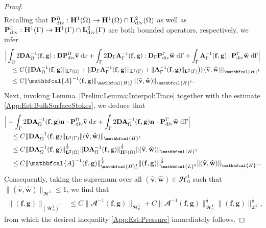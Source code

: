 \documentclass[10pt,reqno]{amsart}
\theoremstyle{remark}
\numberwithin{equation}{section}
\newcommand{\Bigabs}[1]{\Big| #1 \Big|}
\newcommand{\norm}[1]{\| #1 \|}
\newcommand{\n}{\mathbf{n}}
\newcommand{\bv}{\mathbf{v}}
\newcommand{\bw}{\mathbf{w}}
\newcommand{\ww}{\widehat{\bw}}
\newcommand{\wv}{\widehat{\bv}}
\newcommand{\D}{\mathbf{D}}
\newcommand{\f}{\mathbf{f}}
\newcommand{\g}{\mathbf{g}}
\newcommand{\A}{\mathbf{A}}
\newcommand{\Dg}{\mathbf{D}_\Gamma}
\newcommand{\intO}{\int_\Omega}
\newcommand{\intG}{\int_\Gamma}
\newcommand{\dx}{\;\mathrm{d}x}
\newcommand{\dG}{\;\mathrm d\Ga}
\newcommand{\Div}{\textnormal{div}}
\newcommand{\Om}{\Omega}
\newcommand{\Ga}{\Gamma}
\begin{document}
\begin{proof}
\begin{align*}
    \end{align*}
    Recalling that $\mathbf{P}_\Div^\Om:\mathbf{H}^1(\Om)\rightarrow\mathbf{H}^1(\Om)\cap\mathbf{L}^2_\Div(\Om)$ as well as $\mathbf{P}_\Div^\Ga:\mathbf{H}^1(\Ga)\rightarrow\mathbf{H}^1(\Ga)\cap\mathbf{L}^2_\Div(\Ga)$ are both bounded operators, respectively, we infer
    \begin{align*}
        &\Bigabs{\intO 2\D\A_\Om^{-1}(\f,\g):\D\mathbf{P}_\Div^\Om\wv\dx + \intG 2\Dg\A_\Ga^{-1}(\f,\g):\Dg\mathbf{P}_\Div^\Ga\ww\dG  + \intG \mathbf{A}_\Ga^{-1}(\f,\g)\cdot\mathbf{P}_\Div^\Ga\ww\dG} \\
        &\quad\leq C\big(\norm{\D\mathbf{A}_\Om^{-1}(\f,\g)}_{\mathbf{L}^2(\Om)} + \norm{\Dg\mathbf{A}_\Ga^{-1}(\f,\g)}_{\mathbf{L}^2(\Ga)} + \norm{\mathbf{A}_\Ga^{-1}(\f,\g)}_{\mathbf{L}^2(\Ga)}\big)\norm{(\wv,\ww)}_{\mathbfcal{H}^1} \\
        &\quad\leq C\norm{\mathbfcal{A}^{-1}(\f,\g)}_{\mathbfcal{H}^1_{0}}\norm{(\wv,\ww)}_{\mathbfcal{H}^1}.
    \end{align*}
    Next, invoking Lemma~\ref{Prelim:Lemma:Interpol:Trace} together with the estimate \eqref{App:Est:BulkSurfaceStokes}, we deduce that
    \begin{align*}
        &\Bigabs{- \intG 2\D\A_\Om^{-1}(\f,\g)\n\,\cdot\mathbf{P}_\Div^\Om\wv\dx + \intG 2\D\A_\Om^{-1}(\f,\g)\n\,\cdot\mathbf{P}_\Div^\Ga\ww\dG} \\
        &\quad\leq C\norm{\D\A_\Om^{-1}(\f,\g)}_{\mathbf{L}^2(\Ga)}\norm{(\wv,\ww)}_{\mathbfcal{H}^1} \\
        &\quad\leq C\norm{\D\A_\Om^{-1}(\f,\g)}_{\mathbf{L}^2(\Om)}^{\frac12}\norm{\D\A_\Om^{-1}(\f,\g)}_{\mathbf{H}^1(\Om)}^{\frac12}\norm{(\wv,\ww)}_{\mathbfcal{H}^1} \\
        &\quad\leq C\norm{\mathbfcal{A}^{-1}(\f,\g)}_{\mathbfcal{H}^1_{0}}^{\frac12}\norm{(\f,\g)}_{\mathbfcal{L}^2}^{\frac12}\norm{(\wv,\ww)}_{\mathbfcal{H}^1}.
    \end{align*}
    Consequently, taking the supremum over all $(\wv,\ww)\in\mathbfcal{H}^1_0$ such that $\norm{(\wv,\ww)}_{\mathbfcal{H}^1} \leq 1$, we find that
    \begin{align*}
        \norm{(\f,\g)}_{(\mathbfcal{H}^1_0)^\prime} &\leq C\norm{\mathbfcal{A}^{-1}(\f,\g)}_{\mathbfcal{H}^1_{0}} + C\norm{\mathbfcal{A}^{-1}(\f,\g)}_{\mathbfcal{H}^1_0}^{\frac12}\norm{(\f,\g)}_{\mathbfcal{L}^2}^{\frac12},
    \end{align*}
    from which the desired inequality \eqref{App:Est:Pressure} immediately follows.
\end{proof}
\end{document}
